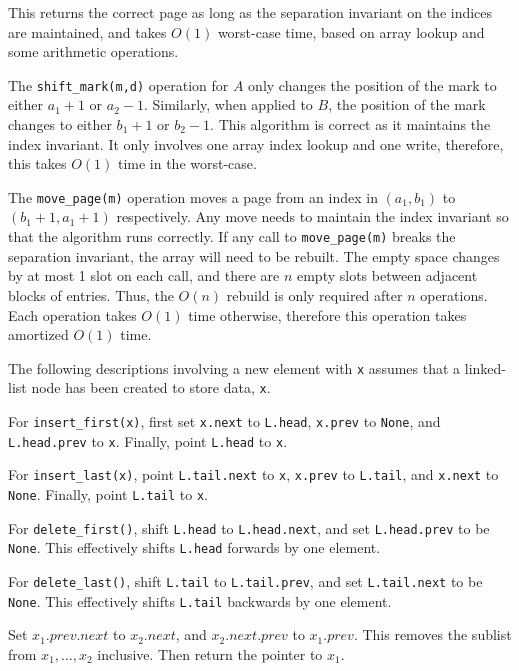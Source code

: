 \documentclass[12pt,twoside]{article}
\begin{document}
\begin{problems}
This returns the correct page as long as the separation invariant on the indices are maintained, and takes \(O(1)\) worst-case time, based on array lookup and some arithmetic operations.

The \verb|shift_mark(m,d)| operation for \(A\) only changes the position of the mark to either \(a_1+1\) or \(a_2-1\). Similarly, when applied to \(B\), the position of the mark changes to either \(b_1+1\) or \(b_2-1\). This algorithm is correct as it maintains the index invariant. It only involves one array index lookup and one write, therefore, this takes \(O(1)\) time in the worst-case.

The \verb|move_page(m)| operation moves a page from an index in \((a_1, b_1)\) to \((b_1+1, a_1+1)\) respectively. Any move needs to maintain the index invariant so that the algorithm runs correctly. If any call to \verb|move_page(m)| breaks the separation invariant, the array will need to be rebuilt. The empty space changes by at most 1 slot on each call, and there are \(n\) empty slots between adjacent blocks of entries. Thus, the \(O(n)\) rebuild is only required after \(n\) operations. Each operation takes \(O(1)\) time otherwise, therefore this operation takes amortized \(O(1)\) time.

\newpage
\problem  %

\begin{problemparts}
\problempart %
The following descriptions involving a new element with \verb|x| assumes that a linked-list node has been created to store data, \verb|x|. 

For \verb|insert_first(x)|, first set \verb|x.next| to \verb|L.head|, \verb|x.prev| to \verb|None|, and \verb|L.head.prev| to \verb|x|. Finally, point \verb|L.head| to \verb|x|.

For \verb|insert_last(x)|, point \verb|L.tail.next| to \verb|x|, \verb|x.prev| to \verb|L.tail|, and \verb|x.next| to \verb|None|. Finally, point \verb|L.tail| to \verb|x|.

For \verb|delete_first()|, shift \verb|L.head| to \verb|L.head.next|, and set \verb|L.head.prev| to be \verb|None|. This effectively shifts \verb|L.head| forwards by one element.

For \verb|delete_last()|, shift \verb|L.tail| to \verb|L.tail.prev|, and set \verb|L.tail.next| to be \verb|None|. This effectively shifts \verb|L.tail| backwards by one element.

\problempart %
Set \(x_1.prev.next\) to \(x_2.next\), and \(x_2.next.prev\) to \(x_1.prev\). This removes the sublist from \(x_1,\ldots,x_2\) inclusive. Then return the pointer to \(x_1\).


\end{problemparts}
\end{problems}
\end{document}
